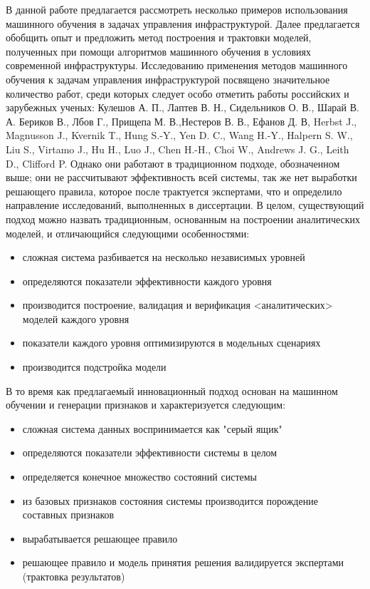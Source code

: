 
{\actuality}
В данной работе предлагается рассмотреть несколько примеров использования машинного обучения в задачах управления инфраструктурой. Далее предлагается обобщить опыт и предложить метод построения и трактовки моделей, полученных при помощи алгоритмов машинного обучения в условиях современной инфраструктуры.
Исследованию применения методов машинного обучения к задачам управления инфраструктурой посвящено значительное количество работ, среди которых следует особо отметить работы российских и зарубежных ученых: Кулешов А. П., Лаптев В. Н., Сидельников О. В., Шарай В. А. Бериков В., Лбов Г., Прищепа М. В.,Нестеров В. В., Ефанов Д. В, Herbst J., Magnusson J., Kvernik T., Hung S.-Y., Yen D. C., Wang H.-Y., Halpern S. W., Liu S., Virtamo J., Hu H., Luo J., Chen H.-H., Choi W., Andrews J. G., Leith D., Clifford P. Однако они работают в традиционном подходе, обозначенном выше; они не рассчитывают эффективность всей системы, так же нет выработки решающего правила, которое после трактуется экспертами, что и определило направление исследований, выполненных в диссертации.
В целом, существующий подход можно назвать традиционным, основанным на построении аналитических моделей, и отличающийся следующими особенностями:
\begin{itemize}
\item  сложная система разбивается на несколько независимых уровней
\item  определяются показатели эффективности каждого уровня
\item  производится построение, валидация и верификация <аналитических> моделей каждого уровня
\item  показатели каждого уровня оптимизируются в модельных сценариях
\item  производится подстройка модели
\end{itemize}
В то время как предлагаемый инновационный подход основан на машинном обучении и генерации признаков и характеризуется следующим:
\begin{itemize}
\item  сложная система данных воспринимается как "серый ящик"
\item  определяются показатели эффективности системы в целом
\item  определяется конечное множество состояний системы
\item  из базовых признаков состояния системы производится порождение составных признаков
\item  вырабатывается решающее правило
\item  решающее правило и модель принятия решения валидируется экспертами (трактовка результатов)
\end{itemize}
